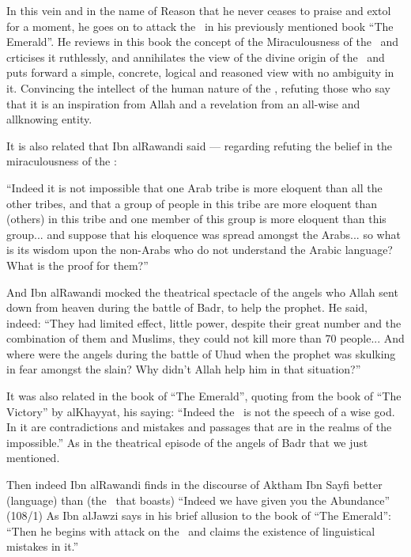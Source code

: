 \documentclass[12pt]{memoir}
\begin{document}
In this vein and in the name of Reason that he never ceases to praise and extol
for a moment, he goes on to attack the \Quran\ in his previously mentioned book
“The Emerald”. He reviews in this book the concept of the Miraculousness of the
\Quran\ and crticises it ruthlessly, and annihilates the view of the divine
origin of the \Quran\ and puts forward a simple, concrete, logical and reasoned
view with no ambiguity in it. Convincing the intellect of the human nature of
the \Quran, refuting those who say that it is an inspiration from Allah and a
revelation from an all-wise and all\–knowing entity.

It is also related that Ibn al\–Rawandi said — regarding refuting the belief in
the miraculousness of the \Quran:

“Indeed it is not impossible that one Arab tribe is more eloquent than all the
other tribes, and that a group of people in this tribe are more eloquent than
(others) in this tribe and one member of this group is more eloquent than this
group... and suppose that his eloquence was spread amongst the Arabs... so what
is its wisdom upon the non-Arabs who do not understand the Arabic language?
What is the proof for them?”\fnmark


And Ibn al\–Rawandi mocked the theatrical spectacle of the angels
who Allah sent down from heaven during the battle of Badr,
to help the prophet.
He said, indeed:
“They had limited effect, little power, despite their great number and
the combination of them and Muslims,
they could not kill more than 70 people...
And where were the angels during the battle of Uhud when the prophet was
skulking in fear amongst the slain?
Why didn’t Allah help him in that situation?”\fnmark


It was also related in the book of “The Emerald”, quoting from the book of
“The Victory” by al\–Khayyat, his saying: “Indeed the \Quran\ is not the speech
of a wise god. In it are contradictions and mistakes and passages that are in
the realms of the impossible.”\fnmark\@
As in the theatrical episode of the angels of Badr that we just mentioned.


Then indeed Ibn al\–Rawandi finds in the discourse of Aktham Ibn Sayfi better
(language) than (the \Quran\ that boasts) “Indeed we have given you the
Abundance” (108/1)\fnmark\@
{}
As Ibn al\–Jawzi says in his brief allusion to the book of “The Emerald”: “Then
he begins with attack on the \Quran\ and claims the existence of linguistical
mistakes in it.”\fnmark
\end{document}
